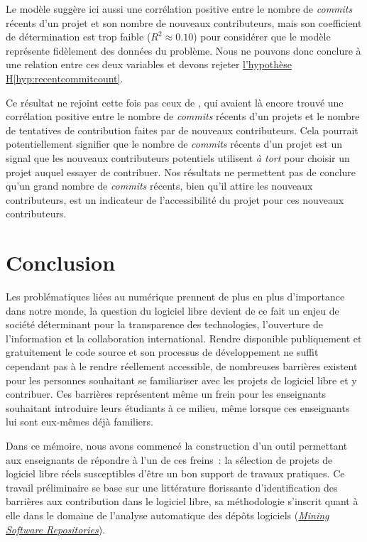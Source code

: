 \documentclass[dvipsnames,runningheads]{llncs}
\newcommand{\en}[1]{\foreignlanguage{english}{\emph{#1}}}
\begin{document}
    Le modèle suggère ici aussi une corrélation positive entre le nombre de \en{commits} récents d'un projet
    et son nombre de nouveaux contributeurs, mais son coefficient de détermination est trop faible ($R^2
    \approx 0.10$) pour considérer que le modèle représente fidèlement des données du problème. Nous ne
    pouvons donc conclure à une relation entre ces deux variables et devons rejeter
    \hyperref[hyp:recentcommitcount]{l'hypothèse H\ref*{hyp:recentcommitcount}}.

    Ce résultat ne rejoint cette fois pas ceux de \textcite[p.~13,16]{signals-2019}, qui avaient là encore
    trouvé une corrélation positive entre le nombre de \en{commits} récents d'un projets et le nombre de
    tentatives de contribution faites par de nouveaux contributeurs. Cela pourrait potentiellement signifier
    que le nombre de \en{commits} récents d'un projet est un signal que les nouveaux contributeurs potentiels
    utilisent \emph{à tort} pour choisir un projet auquel essayer de contribuer. Nos résultats ne permettent
    pas de conclure qu'un grand nombre de \en{commits} récents, bien qu'il attire les nouveaux contributeurs,
    est un indicateur de l'accessibilité du projet pour ces nouveaux contributeurs.

    \section{Conclusion}

    Les problématiques liées au numérique prennent de plus en plus d'importance dans notre monde, la question
    du logiciel libre devient de ce fait un enjeu de société déterminant pour la transparence des
    technologies, l'ouverture de l'information et la collaboration international. Rendre disponible
    publiquement et gratuitement le code source et son processus de développement ne suffit cependant pas à le
    rendre réellement accessible, de nombreuses barrières existent pour les personnes souhaitant se
    familiariser avec les projets de logiciel libre et y contribuer. Ces barrières représentent même un frein
    pour les enseignants souhaitant introduire leurs étudiants à ce milieu, même lorsque ces enseignants lui
    sont eux-mêmes déjà familiers.

    Dans ce mémoire, nous avons commencé la construction d'un outil permettant aux enseignants de répondre à
    l'un de ces freins : la sélection de projets de logiciel libre réels susceptibles d'être un bon support de
    travaux pratiques. Ce travail préliminaire se base sur une littérature florissante d'identification des
    barrières aux contribution dans le logiciel libre, sa méthodologie s'inscrit quant à elle dans le domaine
    de l'analyse automatique des dépôts logiciels (\href{https://conf.researchr.org/series/msr}{\en{Mining
    Software Repositories}}).
\end{document}
